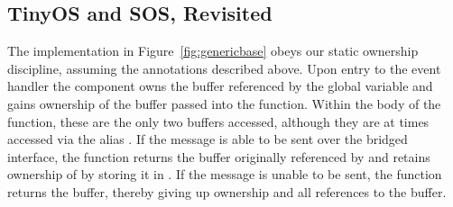 
\subsection{TinyOS and SOS, Revisited}

The 
implementation in Figure~\ref{fig:genericbase} obeys our static ownership
discipline, assuming the annotations described above. 
Upon entry to the
 event handler the  component owns the
buffer referenced by the global variable  and gains
ownership of the  buffer passed into the function.
Within the body of the function, these are the only two
buffers accessed, although they are at times accessed via the alias
.  If the message is able to be sent over the
bridged interface, the function returns the buffer originally referenced by
 and retains ownership of  by storing
it in .  
If the message is unable to be sent, the function
returns the  buffer, thereby giving up ownership and
all references to the buffer.

